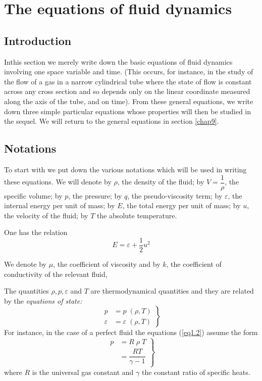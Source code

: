 
\chapter{The equations of fluid dynamics}\label{chap1}


\section{Introduction}\label{chap1:sec1.1}

In\pageoriginale this section we merely write down the basic equations
of fluid dynamics involving one space variable and time. (This occurs,
for instance, in the study of the flow of a gas in a narrow
cylindrical tube where the state of flow is constant across any cross
section and so depends only on the linear coordinate measured along
the axis of the tube, and on time). From these general equations, we
write down three simple particular equations whose properties will
then be studied in the sequel. We will return to the general equations
in section \ref{chap9}.

\section{Notations}\label{chap1:sec1.2}

To start with we put down the various notations which will be used in
writing these equations. We will denote by $\rho$, the density of
the fluid; by $V = \dfrac{1}{\rho}$, the specific volume; by $p$,
the pressure; by $q$, the pseudo-viscosity term; by $\varepsilon$, the
internal energy per unit of mass; by $E$, the total energy per unit of
mass; by $u$, the velocity of the fluid; by $T$ the absolute
temperature.

One has the relation
\begin{equation*}
E = \varepsilon + \frac{1}{2} u^2\tag{1.1}\label{eq1.1}
\end{equation*}


We denote by $\mu$, the coefficient of viscosity and by $k$, the
coefficient of conductivity of the relevant fluid,

The quantities $\rho, p, \varepsilon$ and $T$ are thermodynamical
quantities and they are related by the {\em equations of state:}
\begin{equation*}
\left.
\begin{aligned}
p & = p \; (\rho, T)\\[3pt]
\varepsilon & = \varepsilon \; (\rho, T)
\end{aligned} \right\}
 \tag{1.2}\label{eq1.2}
\end{equation*}
For instance, in the case of a perfect fluid the equations (\ref{eq1.2})
assume the form 
\begin{equation*}
\left.
\begin{aligned}
p & = R \; \rho \; T \\[3pt]
 & = \dfrac{RT}{\gamma -1} 
\end{aligned} \right\}
 \tag{1.3}\label{eq1.3}
\end{equation*}\pageoriginale
where $R$ is the universal gas constant and $\gamma$ the constant
ratio of specific heats.

